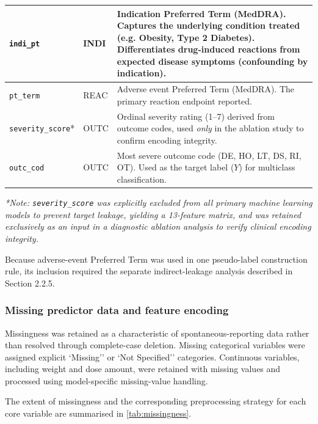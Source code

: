 \documentclass[10pt]{article}
\begin{document}
\begin{table}[htbp]
\begin{tabularx}{\textwidth}{|l|l|>{\raggedright\arraybackslash}X|}
\hline
\texttt{indi\_pt} & INDI & Indication Preferred Term (MedDRA). Captures the underlying condition treated (e.g. Obesity, Type 2 Diabetes). Differentiates drug-induced reactions from expected disease symptoms (confounding by indication). \\
\hline
\texttt{pt\_term} & REAC & Adverse event Preferred Term (MedDRA). The primary reaction endpoint reported. \\
\hline
\texttt{severity\_score}* & OUTC & Ordinal severity rating (1--7) derived from outcome codes, used \emph{only} in the ablation study to confirm encoding integrity. \\
\hline
\texttt{outc\_cod} & OUTC & Most severe outcome code (DE, HO, LT, DS, RI, OT). Used as the target label ($Y$) for multiclass classification. \\
\hline
\end{tabularx}
\smallskip
\noindent\footnotesize\textit{*Note: \texttt{severity\_score} was explicitly excluded from all primary machine learning models to prevent target leakage, yielding a 13-feature matrix, and was retained exclusively as an input in a diagnostic ablation analysis to verify clinical encoding integrity.}
\end{table}

Because adverse-event Preferred Term was used in one pseudo-label construction rule, its inclusion required the separate indirect-leakage analysis described in Section 2.2.5.

 
\subsubsection{Missing predictor data and feature encoding}
Missingness was retained as a characteristic of spontaneous-reporting data rather than resolved through complete-case deletion. Missing categorical variables were assigned explicit `Missing'' or `Not Specified'' categories. Continuous variables, including weight and dose amount, were retained with missing values and processed using model-specific missing-value handling.

The extent of missingness and the corresponding preprocessing strategy for each core variable are summarised in \cref{tab:missingness}.
\end{document}
